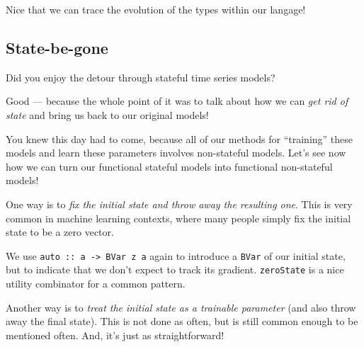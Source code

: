 \documentclass[]{article}
\newenvironment{Shaded}{}{}
\newcommand{\CommentTok}[1]{\textcolor[rgb]{0.38,0.63,0.69}{\textit{#1}}}
\newcommand{\DataTypeTok}[1]{\textcolor[rgb]{0.56,0.13,0.00}{#1}}
\newcommand{\DecValTok}[1]{\textcolor[rgb]{0.25,0.63,0.44}{#1}}
\newcommand{\FunctionTok}[1]{\textcolor[rgb]{0.02,0.16,0.49}{#1}}
\newcommand{\NormalTok}[1]{#1}
\newcommand{\OperatorTok}[1]{\textcolor[rgb]{0.40,0.40,0.40}{#1}}
\newcommand{\OtherTok}[1]{\textcolor[rgb]{0.00,0.44,0.13}{#1}}
\begin{document}
Nice that we can trace the evolution of the types within our langage!

\subsection{State-be-gone}\label{state-be-gone}

Did you enjoy the detour through stateful time series models?

Good --- because the whole point of it was to talk about how we can \emph{get
rid of state} and bring us back to our original models!

You knew this day had to come, because all of our methods for ``training'' these
models and learn these parameters involves non-stateful models. Let's see now
how we can turn our functional stateful models into functional non-stateful
models!

One way is to \emph{fix the initial state and throw away the resulting one}.
This is very common in machine learning contexts, where many people simply fix
the initial state to be a zero vector.

\begin{Shaded}
\end{Shaded}

We use \texttt{auto\ ::\ a\ -\textgreater{}\ BVar\ z\ a} again to introduce a
\texttt{BVar} of our initial state, but to indicate that we don't expect to
track its gradient. \texttt{zeroState} is a nice utility combinator for a common
pattern.

Another way is to \emph{treat the initial state as a trainable parameter} (and
also throw away the final state). This is not done as often, but is still common
enough to be mentioned often. And, it's just as straightforward!
\end{document}

